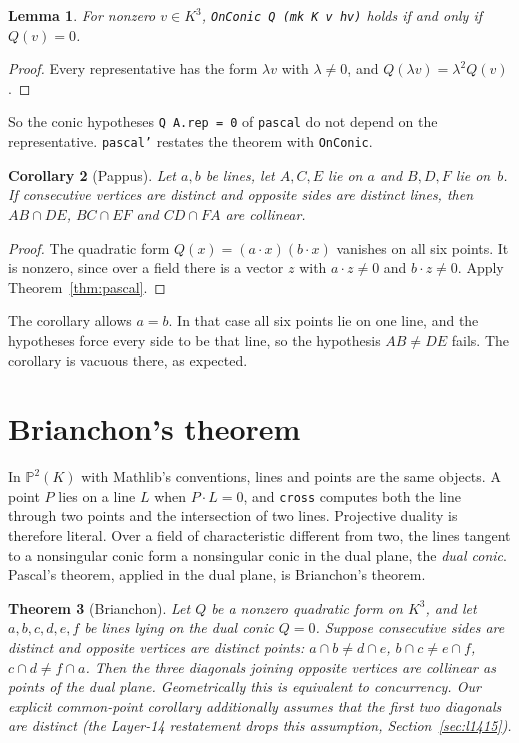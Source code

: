 \documentclass[11pt]{article}
\newtheorem{theorem}{Theorem}
\newtheorem{lemma}[theorem]{Lemma}
\newtheorem{corollary}[theorem]{Corollary}
\theoremstyle{remark}
\newcommand{\lean}[1]{\texttt{#1}}
\newcommand{\PP}{\mathbb{P}}
\begin{document}
\begin{lemma}\label{lem:onconic}
For nonzero $v\in K^3$, \lean{OnConic Q (mk K v hv)} holds if and only if $Q(v)=0$.
\end{lemma}
\begin{proof}
Every representative has the form $\lambda v$ with $\lambda\ne0$, and $Q(\lambda v)=\lambda^2Q(v)$.
\end{proof}

So the conic hypotheses \lean{Q A.rep = 0} of \lean{pascal} do not depend on the representative.
\lean{pascal'} restates the theorem with \lean{OnConic}.

\begin{corollary}[Pappus]\label{cor:pappus}
Let $a,b$ be lines, let $A,C,E$ lie on $a$ and $B,D,F$ lie on~$b$. If consecutive vertices are
distinct and opposite sides are distinct lines, then $AB\cap DE$, $BC\cap EF$ and $CD\cap FA$ are
collinear.
\end{corollary}
\begin{proof}
The quadratic form $Q(x)=(a\cdot x)(b\cdot x)$ vanishes on all six points. It is nonzero, since
over a field there is a vector $z$ with $a\cdot z\ne0$ and $b\cdot z\ne0$. Apply
Theorem~\ref{thm:pascal}.
\end{proof}

The corollary allows $a=b$. In that case all six points lie on one line, and the hypotheses force
every side to be that line, so the hypothesis $AB\ne DE$ fails. The corollary is vacuous there, as
expected.

\section{Brianchon's theorem}\label{sec:brianchon}

In $\PP^2(K)$ with Mathlib's conventions, lines and points are the same objects. A point $P$ lies
on a line $L$ when $P\cdot L=0$, and \lean{cross} computes both the line through two points and the
intersection of two lines. Projective duality is therefore literal. Over a field of characteristic
different from two, the lines tangent to a nonsingular conic form a nonsingular conic in the dual
plane, the \emph{dual conic}. Pascal's theorem, applied in the dual plane, is Brianchon's theorem.

\begin{theorem}[Brianchon]\label{thm:brianchon}
Let $Q$ be a nonzero quadratic form on $K^3$, and let $a,b,c,d,e,f$ be lines lying on the dual
conic $Q=0$. Suppose consecutive sides are distinct and opposite vertices are distinct points:
$a\cap b\ne d\cap e$, $b\cap c\ne e\cap f$, $c\cap d\ne f\cap a$. Then the three diagonals joining
opposite vertices are collinear as points of the dual plane. Geometrically this is equivalent to
concurrency. Our explicit common-point corollary additionally assumes that the first two diagonals
are distinct (the Layer-14 restatement drops this assumption, Section~\ref{sec:l1415}).
\end{theorem}
\end{document}
